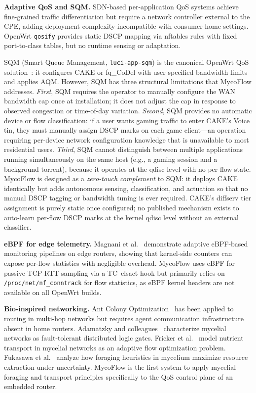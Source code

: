 \documentclass[conference]{IEEEtran}
\begin{document}
\textbf{Adaptive QoS and SQM.}
SDN-based per-application QoS systems achieve fine-grained traffic
differentiation but require a network controller external to the CPE,
adding deployment complexity incompatible with consumer home settings.
OpenWrt \texttt{qosify} provides static DSCP mapping via nftables rules
with fixed port-to-class tables, but no runtime sensing or adaptation.

SQM (Smart Queue Management, \texttt{luci-app-sqm}) is the canonical
OpenWrt QoS solution~\cite{cake2018}: it configures CAKE or fq\_CoDel with
user-specified bandwidth limits and applies AQM.
However, SQM has three structural limitations that MycoFlow addresses.
\emph{First}, SQM requires the operator to manually configure the WAN
bandwidth cap once at installation; it does not adjust the cap in response
to observed congestion or time-of-day variation.
\emph{Second}, SQM provides no automatic device or flow classification:
if a user wants gaming traffic to enter CAKE's Voice tin, they must
manually assign DSCP marks on each game client---an operation requiring
per-device network configuration knowledge that is unavailable to most
residential users.
\emph{Third}, SQM cannot distinguish between multiple applications
running simultaneously on the same host (e.g., a gaming session and a
background torrent), because it operates at the qdisc level with no
per-flow state.
MycoFlow is designed as a \emph{zero-touch complement} to SQM: it deploys
CAKE identically but adds autonomous sensing, classification, and actuation
so that no manual DSCP tagging or bandwidth tuning is ever required.
CAKE's diffserv tier assignment is purely static once configured; no
published mechanism exists to auto-learn per-flow DSCP marks at the
kernel qdisc level without an external classifier.

\textbf{eBPF for edge telemetry.}
Magnani et al.~\cite{magnani2022} demonstrate adaptive eBPF-based monitoring
pipelines on edge routers, showing that kernel-side counters can expose
per-flow statistics with negligible overhead.
MycoFlow uses eBPF for passive TCP RTT sampling via a TC~clsact hook but
primarily relies on \texttt{/proc/net/nf\_conntrack} for flow statistics,
as eBPF kernel headers are not available on all OpenWrt builds.

\textbf{Bio-inspired networking.}
Ant Colony Optimization~\cite{dorigo1996ant} has been applied to routing
in multi-hop networks but requires agent communication infrastructure
absent in home routers.
Adamatzky and colleagues~\cite{adamatzky2022logics} characterize mycelial
networks as fault-tolerant distributed logic gates.
Fricker et al.~\cite{fricker2017mycelium} model nutrient transport in
mycelial networks as an adaptive flow optimization problem.
Fukasawa et al.~\cite{fukasawa2023foraging} analyze how foraging heuristics
in mycelium maximize resource extraction under uncertainty.
MycoFlow is the first system to apply mycelial foraging and transport
principles specifically to the QoS control plane of an embedded router.
\end{document}
